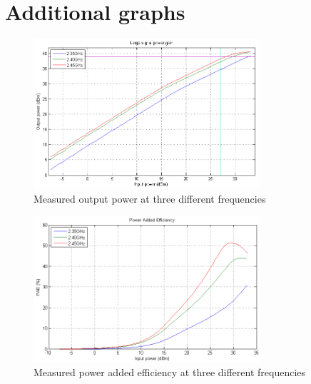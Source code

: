 \chapter{Additional graphs}

  \begin{figure}[h]
	  \centering
	  \includegraphics[width=0.75\textwidth]{img/Power_Out_1tone}
	  \caption{Measured output power at three different frequencies}
	  \label{fig:Meas_Pout}
  \end{figure}

  \begin{figure}[H]
	  \centering
	  \includegraphics[width=0.75\textwidth]{img/Power_Added_Efficiency}
	  \caption{Measured power added efficiency at three different frequencies}
	  \label{fig:Meas_Pae}
  \end{figure}

